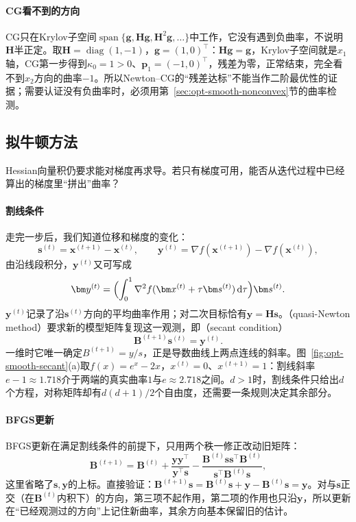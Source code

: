 \paragraph{CG看不到的方向}
CG只在Krylov子空间$\operatorname{span}\{\bm g,\bm H\bm g,\bm H^2\bm g,\dots\}$中工作，它没有遇到负曲率，不说明$\bm H$半正定。取$\bm H=\operatorname{diag}(1,-1)$，$\bm g=(1,0)^\top$：$\bm H\bm g=\bm g$，Krylov子空间就是$x_1$轴，CG第一步得到$\kappa_0=1>0$、$\bm p_1=(-1,0)^\top$，残差为零，正常结束，完全看不到$x_2$方向的曲率$-1$。所以Newton--CG的“残差达标”不能当作二阶最优性的证据；需要认证没有负曲率时，必须用第~\ref{sec:opt-smooth-nonconvex}节的曲率检测。

\subsection{拟牛顿方法}
\label{sec:opt-smooth-quasi-newton}

Hessian向量积仍要求能对梯度再求导。若只有梯度可用，能否从迭代过程中已经算出的梯度里“拼出”曲率？

\paragraph{割线条件}
走完一步后，我们知道位移和梯度的变化：
\[
  \bm s^{(t)}=\bm x^{(t+1)}-\bm x^{(t)},\qquad\bm y^{(t)}=\nabla f(\bm x^{(t+1)})-\nabla f(\bm x^{(t)}),
\]
由沿线段积分，$\bm y^{(t)}$又可写成
\[
  \bm y^{(t)}=\Bigl(\int_0^1\nabla^2f(\bm x^{(t)}+\tau\bm s^{(t)})\,\mathrm d\tau\Bigr)\bm s^{(t)} .
\]
$\bm y^{(t)}$记录了沿$\bm s^{(t)}$方向的平均曲率作用；对二次目标恰有$\bm y=\bm H\bm s$。（quasi-Newton method）要求新的模型矩阵复现这一观测，即（secant condition）
\begin{equation}
\label{eq:opt-smooth-secant}
  \bm B^{(t+1)}\bm s^{(t)}=\bm y^{(t)} .
\end{equation}
一维时它唯一确定$B^{(t+1)}=y/s$，正是导数曲线上两点连线的斜率。图~\ref{fig:opt-smooth-secant}(a)取$f(x)=e^x-2x$，$x^{(t)}=0$、$x^{(t+1)}=1$：割线斜率$e-1\approx1.718$介于两端的真实曲率$1$与$e\approx2.718$之间。$d>1$时，割线条件只给出$d$个方程，对称矩阵却有$d(d+1)/2$个自由度，还需要一条规则决定其余部分。

\paragraph{BFGS更新}
BFGS更新\cite{math-nocedal2006numerical}在满足割线条件的前提下，只用两个秩一修正改动旧矩阵：
\begin{equation}
\label{eq:opt-smooth-bfgs}
  \bm B^{(t+1)}=\bm B^{(t)}+\frac{\bm y\bm y^\top}{\bm y^\top\bm s}-\frac{\bm B^{(t)}\bm s\bm s^\top\bm B^{(t)}}{\bm s^\top\bm B^{(t)}\bm s},
\end{equation}
这里省略了$\bm s,\bm y$的上标。直接验证：$\bm B^{(t+1)}\bm s=\bm B^{(t)}\bm s+\bm y-\bm B^{(t)}\bm s=\bm y$。对与$\bm s$正交（在$\bm B^{(t)}$内积下）的方向，第三项不起作用，第二项的作用也只沿$\bm y$，所以更新在“已经观测过的方向”上记住新曲率，其余方向基本保留旧的估计。


